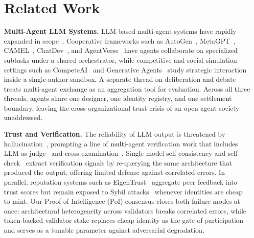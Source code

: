 \section{Related Work}
\label{sec:related_work}

\noindent\textbf{Multi-Agent LLM Systems.} LLM-based multi-agent systems have rapidly expanded in scope~\cite{xi2023rise, wang2024survey_agents}. Cooperative frameworks such as AutoGen~\cite{wu2023autogen}, MetaGPT~\cite{hong2023metagpt}, CAMEL~\cite{li2023camel}, ChatDev~\cite{qian2023communicative}, and AgentVerse~\cite{chen2023agentverse} have agents collaborate on specialized subtasks under a shared orchestrator, while competitive and social-simulation settings such as CompeteAI~\cite{zhao2023competeai} and Generative Agents~\cite{park2023generative} study strategic interaction inside a single-author sandbox. A separate thread on deliberation and debate~\cite{du2024debate, zhuge2024gptswarm, zhang2024proagent, chan2024chateval, zhang2024cooperative_embodied} treats multi-agent exchange as an aggregation tool for evaluation. Across all three threads, agents share one designer, one identity registry, and one settlement boundary, leaving the cross-organizational trust crisis of an open agent society unaddressed.

\noindent\textbf{Trust and Verification.} The reliability of LLM output is threatened by hallucination~\cite{huang2023survey, ji2023hallucination, zhang2023siren}, prompting a line of multi-agent verification work that includes LLM-as-judge~\cite{zheng2023judging, kim2024prometheus} and cross-examination~\cite{cohen2023crossexam}. Single-model self-consistency and self-check~\cite{manakul2023selfcheckgpt, wang2023selfconsistency, dhuliawala2023chainofverification, mundler2024selfcontradictory} extract verification signals by re-querying the same architecture that produced the output, offering limited defense against correlated errors. In parallel, reputation systems such as EigenTrust~\cite{kamvar2003eigentrust} aggregate peer feedback into trust scores but remain exposed to Sybil attacks~\cite{douceur2002sybil} whenever identities are cheap to mint. Our Proof-of-Intelligence (PoI) consensus closes both failure modes at once: architectural heterogeneity across validators breaks correlated errors, while token-backed validator stake replaces cheap identity as the gate of participation and serves as a tunable parameter against adversarial degradation.

